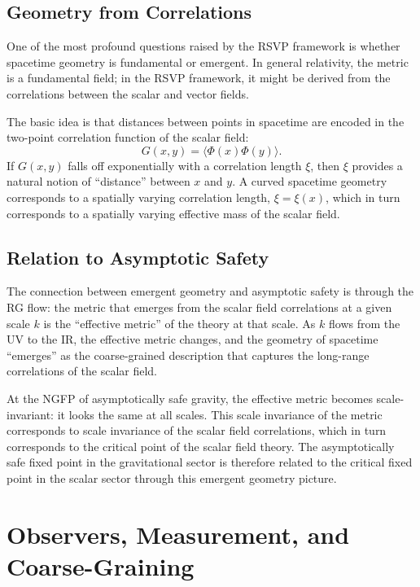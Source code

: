 \documentclass[12pt,a4paper,oneside]{book}
\theoremstyle{definition}
\theoremstyle{plain}
\theoremstyle{remark}
\begin{document}
\section{Geometry from Correlations}

One of the most profound questions raised by the RSVP framework is whether
spacetime geometry is fundamental or emergent. In general relativity, the
metric is a fundamental field; in the RSVP framework, it might be derived
from the correlations between the scalar and vector fields.

The basic idea is that distances between points in spacetime are encoded
in the two-point correlation function of the scalar field:
\begin{equation}
G(x,y) = \langle\Phi(x)\Phi(y)\rangle.
\end{equation}
If $G(x,y)$ falls off exponentially with a correlation length $\xi$, then
$\xi$ provides a natural notion of ``distance'' between $x$ and $y$. A
curved spacetime geometry corresponds to a spatially varying correlation
length, $\xi = \xi(x)$, which in turn corresponds to a spatially varying
effective mass of the scalar field.

\section{Relation to Asymptotic Safety}

The connection between emergent geometry and asymptotic safety is through the
RG flow: the metric that emerges from the scalar field correlations at a given
scale $k$ is the ``effective metric'' of the theory at that scale. As $k$
flows from the UV to the IR, the effective metric changes, and the geometry
of spacetime ``emerges'' as the coarse-grained description that captures the
long-range correlations of the scalar field.

At the NGFP of asymptotically safe gravity, the effective metric becomes
scale-invariant: it looks the same at all scales. This scale invariance of
the metric corresponds to scale invariance of the scalar field correlations,
which in turn corresponds to the critical point of the scalar field theory.
The asymptotically safe fixed point in the gravitational sector is therefore
related to the critical fixed point in the scalar sector through this
emergent geometry picture.

\chapter{Observers, Measurement, and Coarse-Graining}
\end{document}
